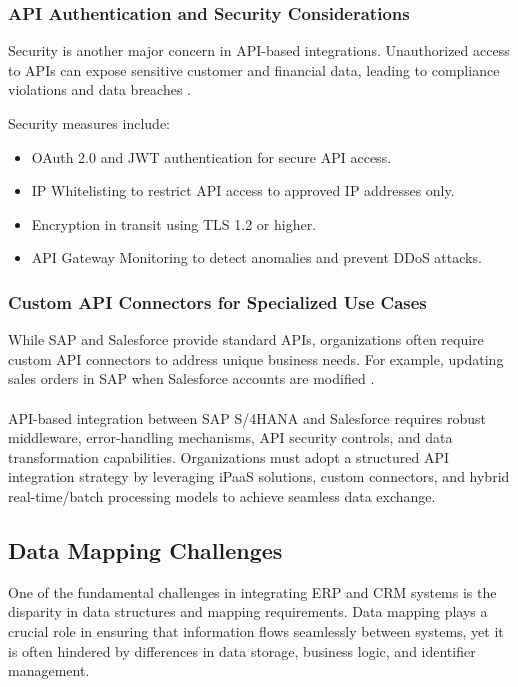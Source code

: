 \subsubsection{API Authentication and Security Considerations}
Security is another major concern in API-based integrations. Unauthorized access to APIs can expose sensitive customer and financial data, leading to compliance violations and data breaches \cite{chinta2024}.

Security measures include:
\begin{itemize}
    \item OAuth 2.0 and JWT authentication for secure API access.
    \item IP Whitelisting to restrict API access to approved IP addresses only.
    \item Encryption in transit using TLS 1.2 or higher.
    \item API Gateway Monitoring to detect anomalies and prevent DDoS attacks.
\end{itemize}

\subsubsection{Custom API Connectors for Specialized Use Cases}
While SAP and Salesforce provide standard APIs, organizations often require custom API connectors to address unique business needs. For example, updating sales orders in SAP when Salesforce accounts are modified \cite{aljawarneh2018}.

\paragraph{}
API-based integration between SAP S/4HANA and Salesforce requires robust middleware, error-handling mechanisms, API security controls, and data transformation capabilities. Organizations must adopt a structured API integration strategy by leveraging iPaaS solutions, custom connectors, and hybrid real-time/batch processing models to achieve seamless data exchange.

\subsection{Data Mapping Challenges}
One of the fundamental challenges in integrating ERP and CRM systems is the disparity in data structures and mapping requirements. Data mapping plays a crucial role in ensuring that information flows seamlessly between systems, yet it is often hindered by differences in data storage, business logic, and identifier management.

